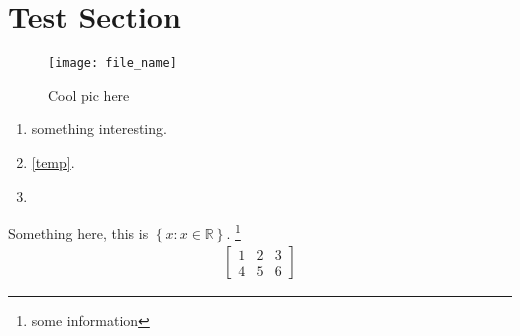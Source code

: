 \documentclass[10pt]{article} %
\makeatletter
\let\footnote\thanks%
	{\LARGE\@title\par}%
\makeatother
\begin{document}
 

\section*{Test Section}

\begin{figure}[!th]
	\centering
	\texttt{[image: file\_name]}
	\caption{Cool pic here}
	\label{fig_cool}
\end{figure}

\begin{enumerate}[label = \arabic*.]
	\item something interesting.
	\item \ref{temp}.
	\item \cite[100]{chen2020}
\end{enumerate}

\begin{definition}
	Something here, this is $\left\{x:x\in\mathbb{R}\right\}$.
	\footnote{some information}
	\begin{align}\label{temp}
		\begin{bmatrix}
			1 & 2 & 3 \\
			4 & 5 & 6
		\end{bmatrix}
		\tag{equation}
	\end{align}
\end{definition}

\end{document}
